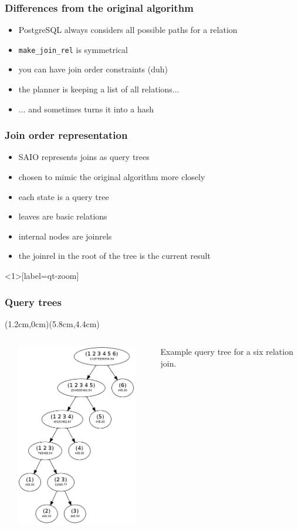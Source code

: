 \documentclass{beamer}
\begin{document}
\begin{frame}
  \frametitle{Differences from the original algorithm}

  \begin{itemize}
  \item PostgreSQL always considers all possible paths for a relation
  \item \texttt{make\_join\_rel} is symmetrical
  \item you can have join order constraints (duh)
  \item the planner is keeping a list of all relations...
  \item ... and sometimes turns it into a hash
  \end{itemize}
\end{frame}

\begin{frame}
  \frametitle{Join order representation}

  \begin{itemize}
  \item SAIO represents joins as \alert{query trees}
  \item chosen to mimic the original algorithm more closely
  \item each state is a query tree
  \item leaves are basic relations
  \item internal nodes are joinrels
  \item the joinrel in the root of the tree is the current result
  \end{itemize}
\end{frame}

\begin{frame}<1>[label=qt-zoom]
  \frametitle<1>{Query trees}
  (1.2cm,0cm)(5.8cm,4.4cm)

  \begin{columns}
    \begin{column}{7cm}
      \includegraphics[width=7cm,height=8cm]{qt-example.png}
    \end{column}
    \begin{column}{5cm}
      Example query tree for a six relation join.
    \end{column}
  \end{columns}

\end{frame}
\end{document}
